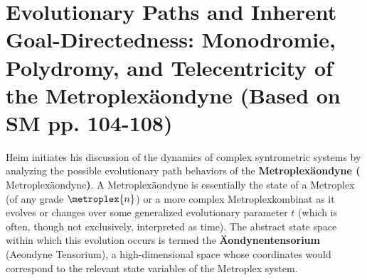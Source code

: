 \documentclass[
    12pt,              %
    a4paper,           %
    headings=normal,   %
    twoside=true,      %
    BCOR=8mm,          %
]{scrbook}
\newcommand{\metroplexaeondyne}{\text{Metroplexäondyne}}
\begin{document}
\section{Evolutionary Paths and Inherent Goal-Directedness: Monodromie, Polydromy, and Telecentricity of the Metroplexäondyne (Based on SM pp. 104-108)}
\label{sec:ch6_polydromie_telezentrik}

Heim initiates his discussion of the dynamics of complex syntrometric systems by analyzing the possible evolutionary path behaviors of the \textbf{Metroplexäondyne (\(\metroplexaeondyne\))}. A \(\metroplexaeondyne\) is essentially the state of a Metroplex (of any grade \(\metroplex{n}\)) or a more complex Metroplexkombinat as it evolves or changes over some generalized evolutionary parameter \(t\) (which is often, though not exclusively, interpreted as time). The abstract state space within which this evolution occurs is termed the \textbf{Äondynentensorium} (Aeondyne Tensorium), a high-dimensional space whose coordinates would correspond to the relevant state variables of the Metroplex system.
\end{document}
